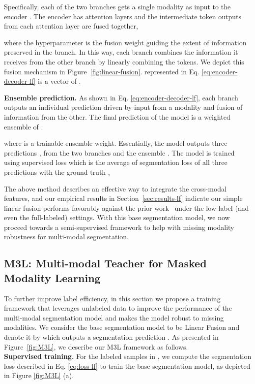 \documentclass[10pt,twocolumn,letterpaper]{article}
\begin{document}
 Specifically, each of the two branches gets a single modality  as input to the encoder . The encoder  has  attention layers and the intermediate token outputs from each attention layer  are fused together, 

 
where the hyperparameter  is the fusion weight guiding the extent of information preserved in the branch. 
In this way, each branch combines the information it receives from the other branch by linearly combining the tokens. We depict this fusion mechanism in Figure~\ref{fig:linear-fusion}.  represented in Eq. \ref{eq:encoder-decoder-lf} is a vector of . 

\noindent\textbf{Ensemble prediction.} As shown in Eq. \ref{eq:encoder-decoder-lf}, each branch outputs an individual prediction driven by input from a modality and fusion of information from the other. The final prediction of the model is a weighted ensemble of . 

where  is a trainable ensemble weight. Essentially, the model outputs three predictions ,  from the two branches and the ensemble . The model is trained using supervised loss  which is the average of segmentation loss  of all three predictions with the ground truth ,



The above method describes an effective way to integrate the cross-modal features, and our empirical results in Section~\ref{sec:results-lf} indicate our simple linear fusion performs favorably against the prior work~\cite{tokenfusion} under the low-label (and even the full-labeled)
settings.
With this base segmentation model, we now proceed towards a semi-supervised framework to help with missing modality robustness for multi-modal segmentation.


\subsection{M3L: Multi-modal Teacher for Masked Modality Learning}
\label{sec:method-M3L}
To further improve label efficiency, in this section we propose a training framework that leverages unlabeled data to improve the performance of the multi-modal segmentation model and makes the model robust to missing modalities. We consider the base segmentation model to be Linear Fusion and denote it by  which outputs a segmentation prediction .
As presented in Figure~\ref{fig:M3L}, we describe our M3L framework as follows.\\


\noindent\textbf{Supervised training.} For the labeled samples in , we compute the segmentation loss described in Eq. \ref{eq:loss-lf} to train the base segmentation model, as depicted in Figure \ref{fig:M3L} (a). \\
\end{document}
